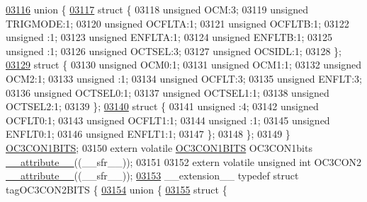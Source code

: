 \begin{DoxyCode}
\hypertarget{a00015_source_l03116}{}\hyperlink{a00015}{03116}   \textcolor{keyword}{union }\{
\hypertarget{a00015_source_l03117}{}\hyperlink{a00015}{03117}     \textcolor{keyword}{struct }\{
03118       \textcolor{keywordtype}{unsigned} OCM:3;
03119       \textcolor{keywordtype}{unsigned} TRIGMODE:1;
03120       \textcolor{keywordtype}{unsigned} OCFLTA:1;
03121       \textcolor{keywordtype}{unsigned} OCFLTB:1;
03122       \textcolor{keywordtype}{unsigned} :1;
03123       \textcolor{keywordtype}{unsigned} ENFLTA:1;
03124       \textcolor{keywordtype}{unsigned} ENFLTB:1;
03125       \textcolor{keywordtype}{unsigned} :1;
03126       \textcolor{keywordtype}{unsigned} OCTSEL:3;
03127       \textcolor{keywordtype}{unsigned} OCSIDL:1;
03128     \};
\hypertarget{a00015_source_l03129}{}\hyperlink{a00015}{03129}     \textcolor{keyword}{struct }\{
03130       \textcolor{keywordtype}{unsigned} OCM0:1;
03131       \textcolor{keywordtype}{unsigned} OCM1:1;
03132       \textcolor{keywordtype}{unsigned} OCM2:1;
03133       \textcolor{keywordtype}{unsigned} :1;
03134       \textcolor{keywordtype}{unsigned} OCFLT:3;
03135       \textcolor{keywordtype}{unsigned} ENFLT:3;
03136       \textcolor{keywordtype}{unsigned} OCTSEL0:1;
03137       \textcolor{keywordtype}{unsigned} OCTSEL1:1;
03138       \textcolor{keywordtype}{unsigned} OCTSEL2:1;
03139     \};
\hypertarget{a00015_source_l03140}{}\hyperlink{a00015}{03140}     \textcolor{keyword}{struct }\{
03141       \textcolor{keywordtype}{unsigned} :4;
03142       \textcolor{keywordtype}{unsigned} OCFLT0:1;
03143       \textcolor{keywordtype}{unsigned} OCFLT1:1;
03144       \textcolor{keywordtype}{unsigned} :1;
03145       \textcolor{keywordtype}{unsigned} ENFLT0:1;
03146       \textcolor{keywordtype}{unsigned} ENFLT1:1;
03147     \};
03148   \};
03149 \} \hyperlink{a00014_d3/dd6/a00624}{OC3CON1BITS};
03150 \textcolor{keyword}{extern} \textcolor{keyword}{volatile} \hyperlink{a00014_d3/dd6/a00624}{OC3CON1BITS} OC3CON1bits \hyperlink{a00015_a493c46f03454991ccc5aa7a6e1dfb2a7}{\_\_attribute\_\_}((\_\_sfr\_\_));
03151 
03152 \textcolor{keyword}{extern} \textcolor{keyword}{volatile} \textcolor{keywordtype}{unsigned} \textcolor{keywordtype}{int}  OC3CON2 \hyperlink{a00015_a493c46f03454991ccc5aa7a6e1dfb2a7}{\_\_attribute\_\_}((\_\_sfr\_\_));
\hypertarget{a00015_source_l03153}{}\hyperlink{a00014}{03153} \_\_extension\_\_ \textcolor{keyword}{typedef} \textcolor{keyword}{struct }tagOC3CON2BITS \{
\hypertarget{a00015_source_l03154}{}\hyperlink{a00015}{03154}   \textcolor{keyword}{union }\{
\hypertarget{a00015_source_l03155}{}\hyperlink{a00015}{03155}     \textcolor{keyword}{struct }\{

\end{DoxyCode}
